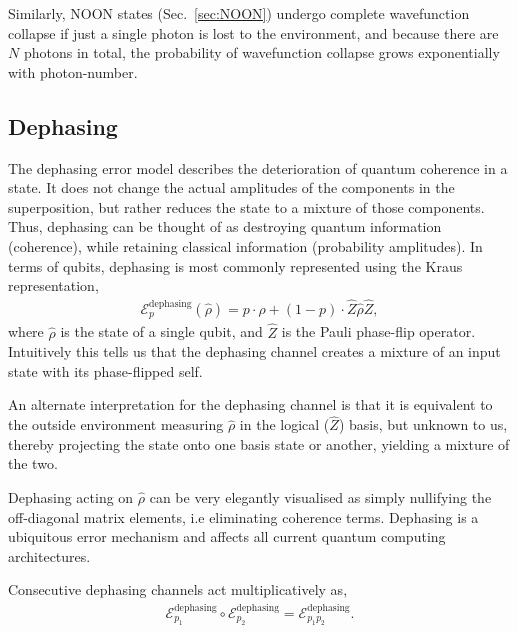 \documentclass[aps,rmp,twocolumn,amsmath,amssymb,nofootinbib,superscriptaddress,longbibliography,floatfix]{revtex4-1}
\begin{document}
Similarly, NOON states (Sec.~\ref{sec:NOON}) undergo complete wavefunction collapse if just a single photon is lost to the environment, and because there are $N$ photons in total, the probability of wavefunction collapse grows exponentially with photon-number.

%
%

\subsection{Dephasing} \label{sec:dephasing_error}

The dephasing error model describes the deterioration of quantum coherence in a state. It does not change the actual amplitudes of the components in the superposition, but rather reduces the state to a mixture of those components. Thus, dephasing can be thought of as destroying quantum information (coherence), while retaining classical information (probability amplitudes). In terms of qubits, dephasing is most commonly represented using the Kraus representation,
\begin{align} \label{eq:dephasing_channel}
\mathcal{E}_p^\mathrm{dephasing}(\hat\rho) = p\cdot\hat\rho + (1-p)\cdot \hat{Z}\hat\rho\hat{Z},
\end{align}
where $\hat\rho$ is the state of a single qubit, and $\hat{Z}$ is the Pauli phase-flip operator. Intuitively this tells us that the dephasing channel creates a mixture of an input state with its phase-flipped self.

An alternate interpretation for the dephasing channel is that it is equivalent to the outside environment measuring $\hat\rho$ in the logical ($\hat{Z}$) basis, but unknown to us, thereby projecting the state onto one basis state or another, yielding a mixture of the two.

Dephasing acting on $\hat\rho$ can be very elegantly visualised as simply nullifying the off-diagonal matrix elements, i.e eliminating coherence terms. Dephasing is a ubiquitous error mechanism and affects all current quantum computing architectures.

Consecutive dephasing channels act multiplicatively as,
\begin{align} \label{eq:multi_deph}
\mathcal{E}_{p_1}^\mathrm{dephasing} \circ \mathcal{E}_{p_2}^\mathrm{dephasing} = \mathcal{E}_{p_1 p_2}^\mathrm{dephasing}.
\end{align}
\end{document}
